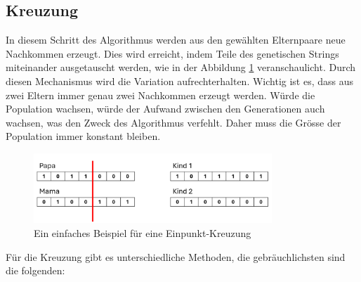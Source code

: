 %
%
%
%
\subsection{Kreuzung
\label{buch:paper:varalg:subsection:crossover}}
In diesem Schritt des Algorithmus werden aus den gewählten Elternpaare 
neue Nachkommen erzeugt. Dies wird erreicht, indem Teile des genetischen 
Strings miteinander ausgetauscht werden, 
wie in der Abbildung \ref{fig:one_point_crossover} veranschaulicht.
Durch diesen Mechanismus wird die Variation aufrechterhalten. Wichtig ist es,
dass aus zwei Eltern immer genau zwei Nachkommen erzeugt werden. Würde
die Population wachsen, würde der Aufwand zwischen den Generationen auch
wachsen, was den Zweck des Algorithmus verfehlt. Daher muss die Grösse der
Population immer konstant bleiben.
\begin{figure}
	\centering
	\includegraphics[width=0.8\textwidth]{
		papers/varalg/images/teil3/05GeneticStringCross.png
	}
	\caption{Ein einfaches Beispiel für eine Einpunkt-Kreuzung}
	\label{fig:one_point_crossover}
\end{figure}
Für die Kreuzung gibt es unterschiedliche Methoden, die gebräuchlichsten sind
die folgenden:
